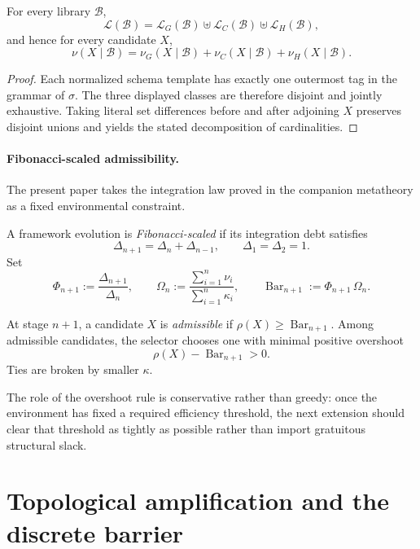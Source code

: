 \documentclass{lmcs}
\newcommand{\B}{\mathcal{B}}
\newcommand{\Lcal}{\mathcal{L}}
\newcommand{\SelBar}{\operatorname{Bar}}
\begin{document}
\begin{prop}
\label{prop:orthogonal}
For every library $\B$,
\[
  \Lcal(\B) = \Lcal_G(\B) \uplus \Lcal_C(\B) \uplus \Lcal_H(\B),
\]
and hence for every candidate $X$,
\[
  \nu(X\mid\B) = \nu_G(X\mid\B) + \nu_C(X\mid\B) + \nu_H(X\mid\B).
\]
\end{prop}

\begin{proof}
Each normalized schema template has exactly one outermost tag in the grammar of $\sigma$. The three displayed classes are therefore disjoint and jointly exhaustive. Taking literal set differences before and after adjoining $X$ preserves disjoint unions and yields the stated decomposition of cardinalities.
\end{proof}

\paragraph{Fibonacci-scaled admissibility.}
The present paper takes the integration law proved in the companion metatheory as a fixed environmental constraint.

\begin{defi}
\label{def:fib-env}
A framework evolution is \emph{Fibonacci-scaled} if its integration debt satisfies
\[
  \Delta_{n+1} = \Delta_n + \Delta_{n-1},
  \qquad
  \Delta_1 = \Delta_2 = 1.
\]
Set
\[
  \Phi_{n+1} := \frac{\Delta_{n+1}}{\Delta_n},
  \qquad
  \Omega_n := \frac{\sum_{i=1}^{n} \nu_i}{\sum_{i=1}^{n} \kappa_i},
  \qquad
  \SelBar_{n+1} := \Phi_{n+1}\,\Omega_n.
\]
\end{defi}

\begin{defi}
\label{def:admissibility}
At stage $n+1$, a candidate $X$ is \emph{admissible} if $\rho(X) \geq \SelBar_{n+1}$. Among admissible candidates, the selector chooses one with minimal positive overshoot
\[
  \rho(X) - \SelBar_{n+1} > 0.
\]
Ties are broken by smaller $\kappa$.
\end{defi}

The role of the overshoot rule is conservative rather than greedy: once the environment has fixed a required efficiency threshold, the next extension should clear that threshold as tightly as possible rather than import gratuitous structural slack.

\section{Topological amplification and the discrete barrier}
\label{sec:topology}
\end{document}
